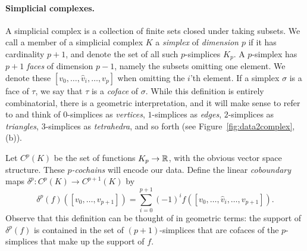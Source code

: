 \paragraph{Simplicial complexes.} 
A simplicial complex is a collection of finite sets closed under taking subsets.
We call a member of a simplicial complex $K$ a \emph{simplex} of \emph{dimension $p$} if it has cardinality $p+1$, and denote the set of all such $p$-simplices $K_p$.
A $p$-simplex has $p+1$ \emph{faces} of dimension $p-1$, namely the subsets omitting one element. We denote these $[v_0,\dotsc,\hat{v}_i,\dotsc, v_p]$ when omitting the $i$'th element.
If a simplex $\sigma$ is a face of $\tau$, we say that $\tau$ is a \emph{coface} of $\sigma$. While this definition is entirely combinatorial, there is a geometric interpretation, and it will make sense to refer to and think of $0$-simplices as \emph{vertices}, $1$-simplices as \emph{edges}, $2$-simplices as \emph{triangles}, $3$-simplices as \emph{tetrahedra}, and so forth (see Figure~\ref{fig:data2complex}, (b)).

Let $C^p(K)$ be the set of functions $K_p\to\mathbb{R}$, with the obvious vector space structure. These \emph{$p$-cochains} will encode our data. Define the linear \emph{coboundary} maps $\delta^p:C^p(K)\to C^{p+1}(K)$ by
\begin{equation*}
\delta^p(f)([v_0,\dotsc,v_{p+1}]) = \sum_{i=0}^{p+1} (-1)^i f([v_0,\dotsc,\hat{v}_i,\dotsc,v_{p+1}]).
\end{equation*}
Observe that this definition can be thought of in geometric terms: the support of $\delta^p(f)$ is contained in the set of $(p+1)$-simplices that are cofaces of the $p$-simplices that make up the support of $f$.

